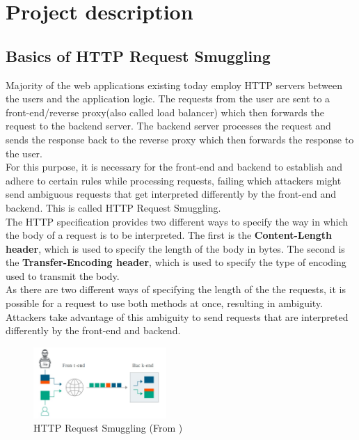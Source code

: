 \documentclass[conference]{IEEEtran}
\begin{document}
\section{Project description}
\subsection*{Basics of HTTP Request Smuggling}
Majority of the web applications existing today employ HTTP servers between the users and the application logic. The requests from the user are sent to a front-end/reverse proxy(also called load balancer) which then forwards the request to the backend server. The backend server processes the request and sends the response back to the reverse proxy which then forwards the response to the user. \\

For this purpose, it is necessary for the front-end and backend to establish and adhere to certain rules while processing requests, failing which attackers might send ambiguous requests that get interpreted differently by the front-end and backend. This is called HTTP Request Smuggling. \\

The HTTP specification provides two different ways to specify the way in which the body of a request is to be interpreted. The first is the \textbf{Content-Length header}, which is used to specify the length of the body in bytes. The second is the \textbf{Transfer-Encoding header}, which is used to specify the type of encoding used to transmit the body. \\

As there are two different ways of specifying the length of the the requests, it is possible for a request to use both methods at once, resulting in ambiguity. Attackers take advantage of this ambiguity to send requests that are interpreted differently by the front-end and backend. \\

\begin{figure}[h]
	\centering
	\includegraphics[width=0.45\textwidth]{results/HRS intro.jpeg}
	\caption{HTTP Request Smuggling (From \cite{lab2})}
	\label{fig:smuggling}
\end{figure}
\end{document}
